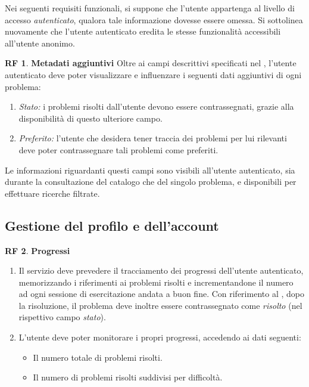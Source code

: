 \documentclass[11pt, a4paper]{article}
\theoremstyle{definition}
\newtheorem{funcreq}{RF} %
\begin{document}
Nei seguenti requisiti funzionali, si suppone che l'utente appartenga al livello
di accesso \textit{autenticato}, qualora tale informazione dovesse essere omessa.
Si sottolinea nuovamente che l'utente autenticato eredita le stesse funzionalità
accessibili all'utente anonimo.
\\
\begin{funcreq}
    \textbf{Metadati aggiuntivi }
    Oltre ai campi descrittivi specificati nel \textcolor{blue}{},
    l'utente autenticato deve poter visualizzare e influenzare i seguenti dati aggiuntivi di
    ogni problema:
    \begin{enumerate}
        \item \textit{Stato:} i problemi risolti dall'utente devono essere contrassegnati,
        grazie alla disponibilità di questo ulteriore campo.
    
        \item \textit{Preferito:} l'utente che desidera tener traccia dei problemi
        per lui rilevanti deve poter contrassegnare tali problemi come preferiti.
    \end{enumerate}
    Le informazioni riguardanti questi campi sono visibili all'utente autenticato,
    sia durante la consultazione del catalogo che del singolo problema, e disponibili
    per effettuare ricerche filtrate.
\end{funcreq}

\newpage
\subsection{Gestione del profilo e dell'account}
\begin{funcreq}
\label{stats}
\textbf{Progressi }
\begin{enumerate}
    \item Il servizio deve prevedere il tracciamento dei progressi dell'utente
    autenticato, memorizzando i riferimenti ai problemi risolti e incrementandone
    il numero ad ogni sessione di esercitazione andata a buon fine. Con riferimento
    al \textcolor{blue}{}, dopo la
    risoluzione, il problema deve inoltre essere contrassegnato come \textit{risolto}
    (nel rispettivo campo \textit{stato}).

    \item L'utente deve poter monitorare i propri progressi, accedendo ai dati
    seguenti:
    \begin{itemize}
        \item Il numero totale di problemi risolti.
        \item Il numero di problemi risolti suddivisi per difficoltà.
    \end{itemize}
\end{enumerate}
\end{funcreq}
\end{document}
